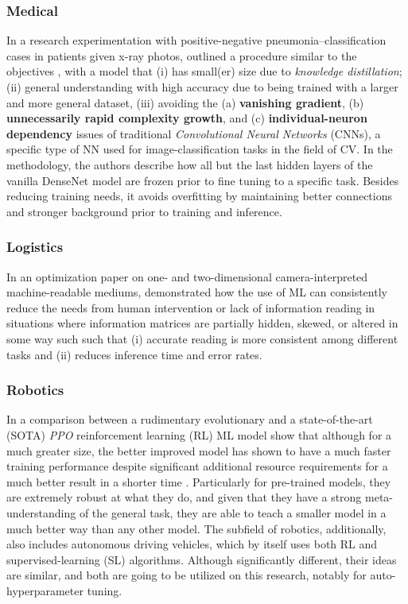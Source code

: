 \documentclass[conference]{IEEEtran}
\begin{document}
\subsubsection{Medical}
In a research experimentation with positive-negative pneumonia–classification cases in patients given x-ray photos, \cite{bundea2024} outlined a procedure similar to the objectives , with a model that (i) has small(er) size due to \textit{knowledge distillation}; (ii) general understanding with high accuracy due to being trained with a larger and more general dataset, (iii) avoiding the (a) \textbf{vanishing gradient}, (b) \textbf{unnecessarily rapid complexity growth}, and (c) \textbf{individual-neuron dependency} issues of traditional \textit{Convolutional Neural Networks} (CNNs), a specific type of NN used for image-classification tasks in the field of CV. In the methodology, the authors describe how all but the last hidden layers of the vanilla DenseNet model are frozen prior to fine tuning to a specific task. Besides reducing training needs, it avoids overfitting by maintaining better connections and stronger background prior to training and inference.

\subsubsection{Logistics}
In an optimization paper on one- and two-dimensional camera-interpreted machine-readable mediums, \cite{chen2024} demonstrated how the use of ML can consistently reduce the needs from human intervention or lack of information reading in situations where information matrices are partially hidden, skewed, or altered in some way such such that (i) accurate reading is more consistent among different tasks and (ii) reduces inference time and error rates.

\subsubsection{Robotics}
In a comparison between a rudimentary evolutionary and a state-of-the-art (SOTA) \textit{PPO} reinforcement learning (RL) ML model show that although for a much greater size, the better improved model has shown to have a much faster training performance despite significant additional resource requirements for a much better result in a shorter time \cite{RLsota2024}. Particularly for pre-trained models, they are extremely robust at what they do, and given that they have a strong meta-understanding of the general task, they are able to teach a smaller model in a much better way than any other model. The subfield of robotics, additionally, also includes autonomous driving vehicles, which by itself uses both RL and supervised-learning (SL) algorithms. Although significantly different, their ideas are similar, and both are going to be utilized on this research, notably for auto-hyperparameter tuning.
\end{document}
